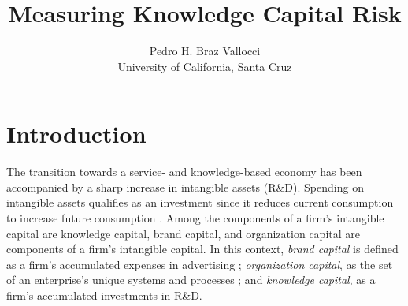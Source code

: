 \documentclass[12pt, letterpaper]{article}
\begin{document}
\title{Measuring Knowledge Capital Risk} %
\author{Pedro H. Braz Vallocci \\ University of California, Santa Cruz} %

\newcommand{\ffo}{dicfullmc10thr10defnob5noa0_8_4t}

\newcommand{\insertfigure}[3]{
\begin{figure}[H]
  \centering
  \texttt{[image: \\ffo/\#1]}
  \caption{#2}
  \label{fig:#1}
\end{figure}
}


\newcommand{\tkk}{$Topic_{kk}$ }

\maketitle %

\onehalfspacing %

\section{Introduction}

The transition towards a service- and knowledge-based economy has been accompanied by a sharp increase in intangible assets (R\&D). Spending on intangible assets qualifies as an investment since it reduces current consumption to increase future consumption \citep{Corrado2009-kd, Corrado2009-hk}. Among the components of a firm's intangible capital are knowledge capital, brand capital, and organization capital are components of a firm's intangible capital.  In this context, \emph{brand capital} is defined as a firm's accumulated expenses in advertising \citep{Belo2019-iz}; \emph{organization capital}, as the set of an enterprise's unique systems and processes %
\citep{Eisfeldt2013-ad, Bloom2007-gl}; and \emph{knowledge capital}, as a firm's accumulated investments in R\&D.
\end{document}
